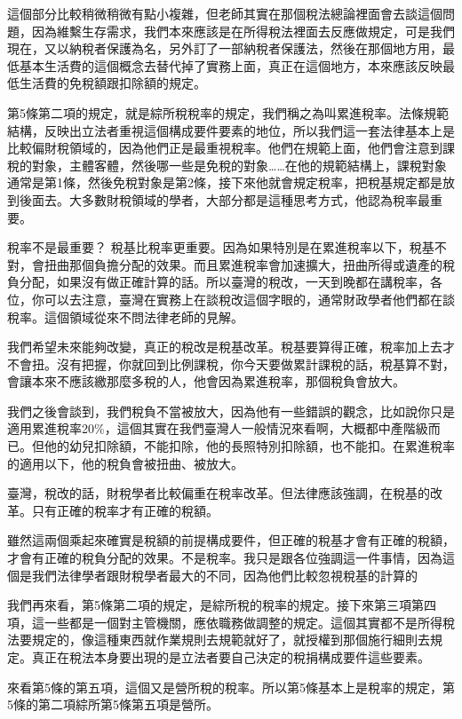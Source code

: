 \documentclass[oneside,sub3section]{ctexbook}
\begin{document}
這個部分比較稍微稍微有點小複雜，但老師其實在那個稅法總論裡面會去談這個問題，因為維繫生存需求，我們本來應該是在所得稅法裡面去反應做規定，可是我們現在，又以納稅者保護為名，另外訂了一部納稅者保護法，然後在那個地方用，最低基本生活費的這個概念去替代掉了實務上面，真正在這個地方，本來應該反映最低生活費的免稅額跟扣除額的規定。

第5條第二項的規定，就是綜所稅稅率的規定，我們稱之為叫累進稅率。法條規範結構，反映出立法者重視這個構成要件要素的地位，所以我們這一套法律基本上是比較偏財稅領域的，因為他們正是最重視稅率。他們在規範上面，他們會注意到課稅的對象，主體客體，然後哪一些是免稅的對象\ldots\ldots 在他的規範結構上，課稅對象通常是第1條，然後免稅對象是第2條，接下來他就會規定稅率，把稅基規定都是放到後面去。大多數財稅領域的學者，大部分都是這種思考方式，他認為稅率最重要。

稅率不是最重要？ 稅基比稅率更重要。因為如果特別是在累進稅率以下，稅基不對，會扭曲那個負擔分配的效果。而且累進稅率會加速擴大，扭曲所得或遺產的稅負分配，如果沒有做正確計算的話。所以臺灣的稅改，一天到晚都在講稅率，各位，你可以去注意，臺灣在實務上在談稅改這個字眼的，通常財政學者他們都在談稅率。這個領域從來不問法律老師的見解。

我們希望未來能夠改變，真正的稅改是稅基改革。稅基要算得正確，稅率加上去才不會扭。沒有把握，你就回到比例課稅，你今天要做累計課稅的話，稅基算不對，會讓本來不應該繳那麼多稅的人，他會因為累進稅率，那個稅負會放大。

我們之後會談到，我們稅負不當被放大，因為他有一些錯誤的觀念，比如說你只是適用累進稅率20\%，這個其實在我們臺灣人一般情況來看啊，大概都中產階級而已。但他的幼兒扣除額，不能扣除，他的長照特別扣除額，也不能扣。在累進稅率的適用以下，他的稅負會被扭曲、被放大。

臺灣，稅改的話，財稅學者比較偏重在稅率改革。但法律應該強調，在稅基的改革。只有正確的稅率才有正確的稅額。

雖然這兩個乘起來確實是稅額的前提構成要件，但正確的稅基才會有正確的稅額，才會有正確的稅負分配的效果。不是稅率。我只是跟各位強調這一件事情，因為這個是我們法律學者跟財稅學者最大的不同，因為他們比較忽視稅基的計算的

我們再來看，第5條第二項的規定，是綜所稅的稅率的規定。接下來第三項第四項，這一些都是一個對主管機關，應依職務做調整的規定。這個其實都不是所得稅法要規定的，像這種東西就作業規則去規範就好了，就授權到那個施行細則去規定。真正在稅法本身要出現的是立法者要自己決定的稅捐構成要件這些要素。

來看第5條的第五項，這個又是營所稅的稅率。所以第5條基本上是稅率的規定，第5條的第二項綜所第5條第五項是營所。
\end{document}

